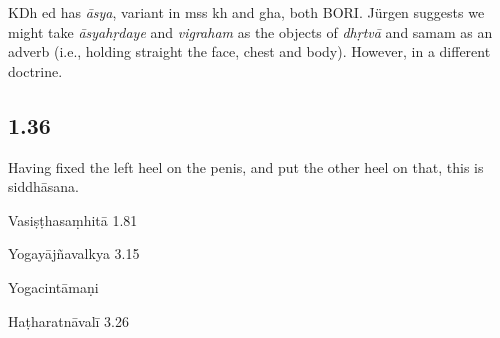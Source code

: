 \begin{ekdosis}
\begin{testimonia}[hp01_035]
\end{testimonia}

\begin{philcomm}[hp01_035]
KDh ed has \emph{āsya}, variant in mss kh and gha, both BORI.
Jürgen suggests we might take \emph{āsyahṛdaye} and \emph{vigraham} as the objects of \emph{dhṛtvā} and samam as an adverb (i.e., holding straight the face, chest and body). However, in a different doctrine.
\end{philcomm}

\subsection*{1.36}
\begin{translation}[hp01_036]
Having fixed the left heel on the penis, and put the other heel on that, this is siddhāsana.
\end{translation}

\begin{sources}[hp01_036]
Vasiṣṭhasaṃhitā 1.81

\begin{versinnote}
\end{versinnote}

Yogayājñavalkya 3.15

\begin{versinnote}
\end{versinnote}

\end{sources}

\begin{testimonia}[hp01_036]
Yogacintāmaṇi

\begin{versinnote}
\end{versinnote}

Haṭharatnāvalī 3.26

\begin{versinnote}
\end{versinnote}


\end{testimonia}
\end{ekdosis}
